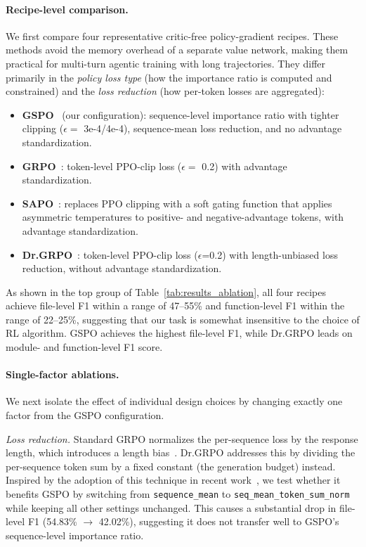\paragraph{Recipe-level comparison.}
We first compare four representative critic-free policy-gradient recipes. These methods avoid the memory overhead of a separate value network, making them practical for multi-turn agentic training with long trajectories. They differ primarily in the \emph{policy loss type} (how the importance ratio is computed and constrained) and the \emph{loss reduction} (how per-token losses are aggregated):
\begin{itemize}
    \item \textbf{GSPO}~\citep{zheng2025groupsequencepolicyoptimization} (our configuration): sequence-level importance ratio with tighter clipping ($\epsilon = $ 3e-4/4e-4), sequence-mean loss reduction, and no advantage standardization.
    \item \textbf{GRPO}~\citep{shao2024deepseekmathpushinglimitsmathematical}: token-level PPO-clip loss ($\epsilon = $ 0.2) with advantage standardization.
    \item \textbf{SAPO}~\citep{gao2025softadaptivepolicyoptimization}: replaces PPO clipping with a soft gating function that applies asymmetric temperatures to positive- and negative-advantage tokens, with advantage standardization.
    \item \textbf{Dr.GRPO}~\citep{liu2025understandingr1zeroliketrainingcritical}: token-level PPO-clip loss ($\epsilon$=0.2) with length-unbiased loss reduction, without advantage standardization.
\end{itemize}
As shown in the top group of Table~\ref{tab:results_ablation}, all four recipes achieve file-level F1 within a range of 47--55\% and function-level F1 within the range of 22--25\%, suggesting that our task is somewhat insensitive to the choice of RL algorithm. GSPO achieves the highest file-level F1, while Dr.GRPO leads on module- and function-level F1 score.

\paragraph{Single-factor ablations.}
We next isolate the effect of individual design choices by changing exactly one factor from the GSPO configuration.

\emph{Loss reduction.} Standard GRPO normalizes the per-sequence loss by the response length, which introduces a length bias~\citep{liu2025understandingr1zeroliketrainingcritical}. Dr.GRPO addresses this by dividing the per-sequence token sum by a fixed constant (the generation budget) instead. Inspired by the adoption of this technique in recent work~\citep{cognition2025swegrep}, we test whether it benefits GSPO by switching from \texttt{sequence\_mean} to \texttt{seq\_mean\_token\_sum\_norm} while keeping all other settings unchanged. This causes a substantial drop in file-level F1 (54.83\% $\to$ 42.02\%), suggesting it does not transfer well to GSPO's sequence-level importance ratio.

